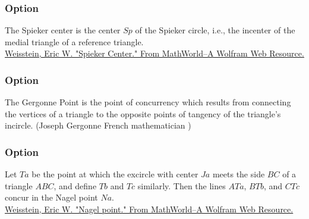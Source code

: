 \subsubsection{Option }
The Spieker center is the center $Sp$ of the Spieker circle, i.e., the incenter of the medial triangle of a reference triangle.\\
\href{https://mathworld.wolfram.com/SpiekerCenter.html}{Weisstein, Eric W. "Spieker Center." From MathWorld--A Wolfram Web Resource. }

\begin{tkzexample}[latex=8cm,small]
\end{tkzexample}

\subsubsection{Option }

The Gergonne Point is the point of concurrency which results from connecting the vertices of a triangle to the opposite points of tangency of the triangle's incircle. 
(Joseph Gergonne French mathematician )

\begin{tkzexample}[latex=8cm,small]
\end{tkzexample}

\subsubsection{Option }
Let $Ta$ be the point at which the excircle with center $Ja$ meets the side $BC$ of a triangle $ABC$, and define $Tb$ and $Tc$ similarly. Then the lines $ATa$, $BTb$, and $CTc$ concur in the Nagel point $Na$.\\
\href{https://mathworld.wolfram.com/NagelPoint.html}{Weisstein, Eric W. "Nagel point." From MathWorld--A Wolfram Web Resource. }


